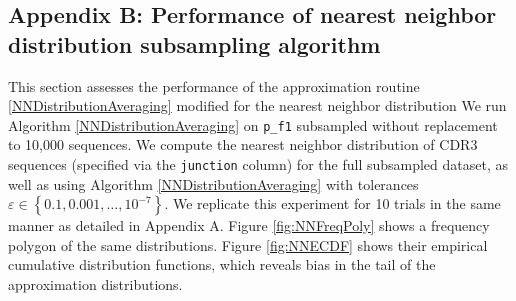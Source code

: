 \documentclass{article}
\begin{document}
\subsection*{Appendix B: Performance of nearest neighbor distribution subsampling algorithm}
This section assesses the performance of the approximation routine \ref{NNDistributionAveraging} modified for the nearest neighbor distribution
We run Algorithm \ref{NNDistributionAveraging} on \texttt{p\_f1} subsampled without replacement to 10,000 sequences.
We compute the nearest neighbor distribution of CDR3 sequences (specified via the \texttt{junction} column) for the full subsampled dataset, as well as using Algorithm \ref{NNDistributionAveraging} with tolerances $\varepsilon \in \left\{0.1, 0.001, \dotsc, 10^{-7} \right\}$.
We replicate this experiment for 10 trials in the same manner as detailed in Appendix A.
Figure \ref{fig:NNFreqPoly} shows a frequency polygon of the same distributions.
Figure \ref{fig:NNECDF} shows their empirical cumulative distribution functions, which reveals bias in the tail of the approximation distributions.
\end{document}
